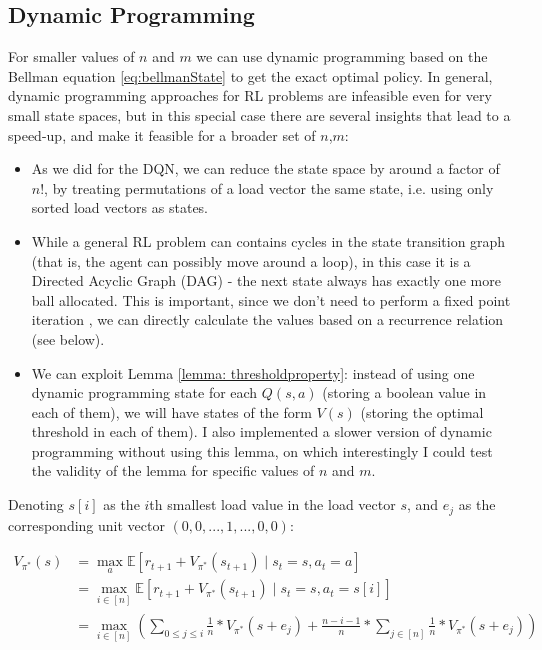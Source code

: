 
\subsection{Dynamic Programming}


For smaller values of $n$ and $m$ we can use dynamic programming based on the Bellman equation \ref{eq:bellmanState} to get the exact optimal policy. In general, dynamic programming approaches for RL problems are infeasible even for very small state spaces, but in this special case there are several insights that lead to a speed-up, and make it feasible for a broader set of $n$,$m$:


\begin{itemize}
    \item 
    As we did for the DQN, we can reduce the state space by around a factor of $n!$, by treating permutations of a load vector the same state, i.e. using only sorted load vectors as states.
    \item
    While a general RL problem can contains cycles in the state transition graph (that is, the agent can possibly move around a loop), in this case it is a Directed Acyclic Graph (DAG) - the next state always has exactly one more ball allocated. This is important, since we don't need to perform a fixed point iteration \cite{rhoades1991fixedpointiteration}, we can directly calculate the values based on a recurrence relation (see below).
    \item
    We can exploit Lemma \ref{lemma: thresholdproperty}: instead of using one dynamic programming state for each $Q(s,a)$ (storing a boolean value in each of them), we will have states of the form $V(s)$ (storing the optimal threshold in each of them). I also implemented a slower version of dynamic programming without using this lemma, on which interestingly I could test the validity of the lemma for specific values of $n$ and $m$.
\end{itemize}


Denoting $s[i]$ as the $i$th smallest load value in the load vector $s$, and $e_j$ as the corresponding unit vector $(0, 0, ... , 1, ..., 0, 0)$:

\begin{equation} \label{eq:twothinning-dynamicprogramming}
\begin{split}
    V_{\pi^*}(s) &= \max_a \mathbb{E} [r_{t+1} + V_{\pi^*}(s_{t+1}) \mid s_t=s, a_t=a] \\
    &= \max_{i \in [n]} \mathbb{E} [r_{t+1} + V_{\pi^*}(s_{t+1}) \mid s_t=s, a_t=s[i]] \\
    &= \max_{i \in [n]} (\sum_{0\leq j \leq i} \frac{1}{n}*V_{\pi^*}(s+e_j) + \frac{n-i-1}{n} * \sum_{j \in [n]} \frac{1}{n}*V_{\pi^*}(s+e_j))
\end{split}
\end{equation}


